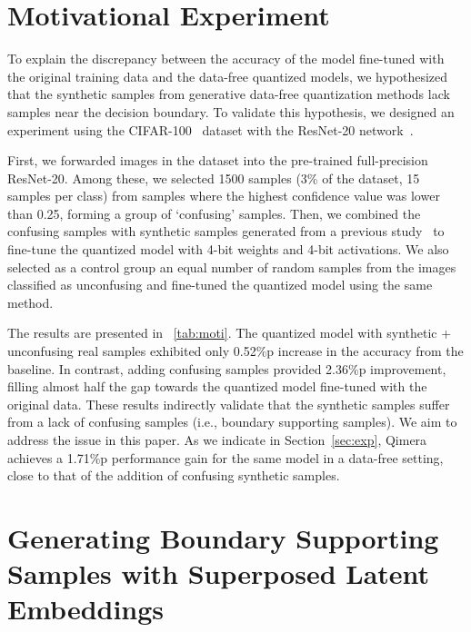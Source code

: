 \documentclass{article}
\newcommand{\aname}{Qimera\xspace}
\newcommand{\JL}[1]{{\color{magenta}[\textbf{\sc JLee}: \textit{#1}]}}
\newcommand{\KH}[1]{{\color{purple}[\textbf{\sc KH}: \textit{#1}]}}
\renewcommand{\JL}[1]{}
\renewcommand{\KH}[1]{}
\begin{document}
\section{Motivational Experiment}
To explain the discrepancy between the accuracy of the model fine-tuned with the original training data and the data-free quantized models, we hypothesized that the synthetic samples from generative data-free quantization methods lack samples near the decision boundary.
To validate this hypothesis, we designed an experiment using the CIFAR-100~\cite{cifar} dataset with the ResNet-20 network~\cite{resnet}. 


First, we forwarded images in the dataset into the pre-trained full-precision ResNet-20. 
Among these, we selected 1500 samples (3\% of the dataset, 15 samples per class) from samples where the highest confidence value was lower than 0.25, forming a group of ‘confusing’ samples.
Then, we combined the confusing samples with synthetic samples generated from a previous study~\cite{gdfq} to fine-tune the quantized model with 4-bit weights and 4-bit activations. 
We also selected as a control group an equal number of random samples from the images classified as unconfusing and fine-tuned the quantized model using the same method.


The results are presented in \tablename~\ref{tab:moti}.
The quantized model with synthetic + unconfusing real samples exhibited only 0.52\%p increase in the accuracy from the baseline.
In contrast, adding confusing samples provided 2.36\%p improvement, filling almost half the gap towards the quantized model fine-tuned with the original data. 
These results indirectly validate that the synthetic samples suffer from a lack of confusing samples (i.e., boundary supporting samples). 
We aim to address the issue in this paper.
As we indicate in Section~\ref{sec:exp}, \aname achieves a 1.71\%p \KH{CHECK!} performance gain for the same model in a data-free  setting, close to that of the addition of confusing synthetic samples.


\JL{somewhere: simple yet effective}




\section{Generating Boundary Supporting Samples with Superposed Latent Embeddings}
\label{sec:method}
\end{document}
